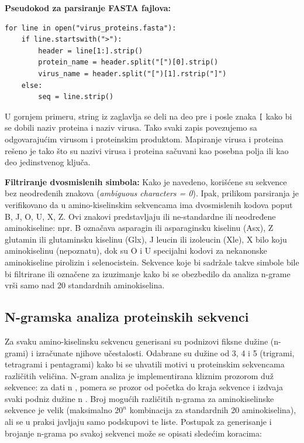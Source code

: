 \documentclass[a4paper,12pt]{article}
\begin{document}
\vspace{10pt}
\textbf{Pseudokod za parsiranje FASTA fajlova:}

\begin{lstlisting}
for line in open("virus_proteins.fasta"):
    if line.startswith(">"):
        header = line[1:].strip()
        protein_name = header.split("[")[0].strip()
        virus_name = header.split("[")[1].rstrip("]")
    else:
        seq = line.strip() 
\end{lstlisting}

U gornjem primeru, string iz zaglavlja se deli na deo pre i posle znaka \texttt{[} kako bi se dobili naziv proteina i
naziv virusa. Tako svaki zapis povezujemo sa odgovarajućim virusom i proteinskim produktom. Mapiranje
virusa i proteina rešeno je tako što su nazivi virusa i proteina sačuvani kao posebna polja ili kao deo
jedinstvenog ključa. 

\vspace{10pt}
\textbf{Filtriranje dvosmislenih simbola:} Kako je navedeno, korišćene su sekvence bez neodređenih znakova
(\textit{ambiguous characters = 0}). Ipak, prilikom parsiranja je verifikovano da u amino-kiselinskim sekvencama
ima dvosmislenih kodova poput B, J, O, U, X, Z. Ovi znakovi predstavljaju ili ne-standardne ili neodređene
aminokiseline: npr. B označava asparagin ili asparaginsku kiselinu (Asx), Z glutamin ili glutaminsku kiselinu
(Glx), J leucin ili izoleucin (Xle), X bilo koju aminokiselinu (nepoznatu), dok su O i U specijalni kodovi za
nekanonske aminokiseline pirolizin i selenocistein. Sekvence koje bi sadržale takve simbole bile bi
filtrirane ili označene za izuzimanje kako bi se obezbedilo da analiza n-grame vrši samo nad 20 standardnih
aminokiselina. 

\subsection{N-gramska analiza proteinskih sekvenci}

Za svaku amino-kiselinsku sekvencu generisani su podnizovi
fiksne dužine (n-grami) i izračunate njihove učestalosti. Odabrane su dužine od 3, 4 i 5 (trigrami, tetragrami i
pentagrami) kako bi se uhvatili motivi u proteinskim sekvencama različitih veličina. N-gram analiza je
implementirana kliznim prozorom duž sekvence: za dati n , pomera se prozor od početka do kraja
sekvence i izdvaja svaki podniz dužine n . Broj mogućih različitih n-grama za aminokiselinske sekvence je
velik (maksimalno $20^n$ kombinacija za standardnih 20 aminokiselina), ali se u praksi javljaju samo
podskupovi te liste. Postupak za generisanje i brojanje n-grama po svakoj sekvenci može se opisati sledećim
koracima:
\end{document}
